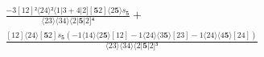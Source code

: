 \documentclass[varwidth, border=5pt]{standalone}
\begin{document}
\begin{my}
$\begin{gathered}
\scriptscriptstyle\frac{-3[12]²⟨24⟩²⟨1|3+4|2][𝟓2]⟨2𝟓⟩s_{𝟓}}{⟨23⟩⟨34⟩⟨2|𝟓|2]⁴} +\\
\scriptscriptstyle\frac{[12]⟨24⟩[𝟓2]s_{𝟓}(-1⟨14⟩⟨2𝟓⟩[12]-1⟨24⟩⟨3𝟓⟩[23]-1⟨24⟩⟨4𝟓⟩[24])}{⟨23⟩⟨34⟩⟨2|𝟓|2]³} \phantom{+}
\end{gathered}$
\end{my}
\end{document}
